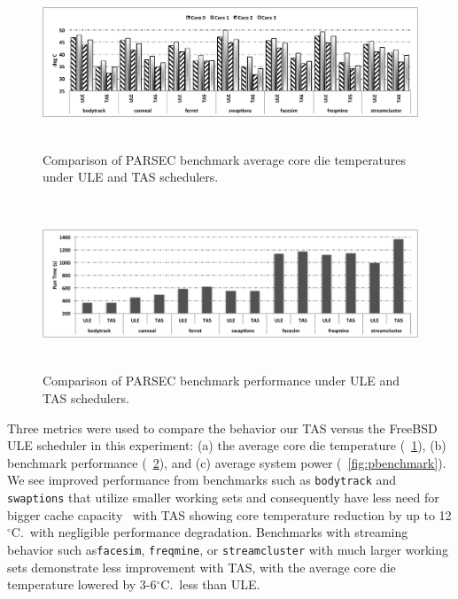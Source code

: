 \documentclass[times, 10pt,twocolumn]{IEEEtran}
\begin{document}
\begin{figure}[tbp] 
\centering
  \includegraphics[width=1.0\linewidth,height=2in]{graphics/parsectemp}
  \caption{Comparison of PARSEC benchmark average core die temperatures
under ULE and TAS schedulers.}
  \label{fig:pbenchmarkt}
\end{figure}
\begin{figure}[tbp]
  \includegraphics[width=1.0\linewidth,height=2in]{graphics/parsecperformance}
  \caption{Comparison of PARSEC benchmark performance under ULE and TAS
schedulers.}
  \label{fig:pbenchmarkp}
\end{figure} 
Three metrics were used to compare the behavior our TAS versus the
FreeBSD ULE scheduler in this experiment: (a) the average core die
temperature (\figurename~\ref{fig:pbenchmarkt}), (b) benchmark
performance (\figurename~\ref{fig:pbenchmarkp}), and (c) average system
power (\figurename~\ref{fig:pbenchmark}).  We see improved performance
from benchmarks such as \texttt{bodytrack} and \texttt{swaptions} that
utilize smaller working sets and consequently have less need for bigger
cache capacity~\cite{Bienia2011} with TAS showing core temperature
reduction by up to 12$^{\circ}$C.\ with negligible performance
degradation.  Benchmarks with streaming behavior such
as\texttt{facesim}, \texttt{freqmine}, or \texttt{streamcluster} with
much larger working sets demonstrate less improvement with TAS, with the
average core die temperature lowered by 3-6$^{\circ}$C.\ less than ULE.
\end{document}
